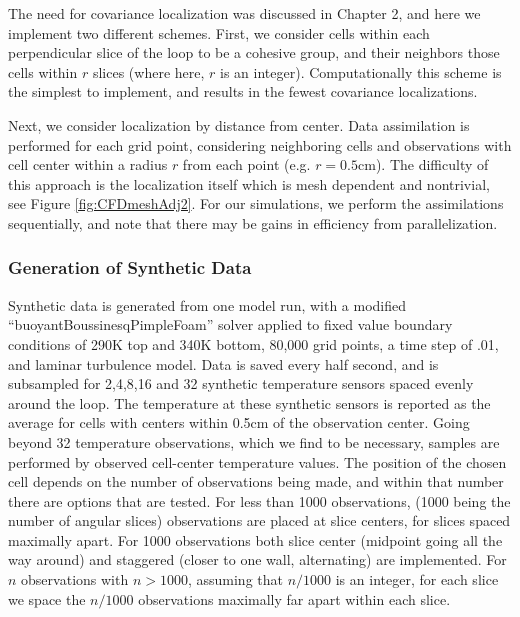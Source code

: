 The need for covariance localization was discussed in Chapter 2, and here we implement two different schemes.
First, we consider cells within each perpendicular slice of the loop to be a cohesive group, and their neighbors those cells within $r$ slices (where here, $r$ is an integer).
Computationally this scheme is the simplest to implement, and results in the fewest covariance localizations.

Next, we consider localization by distance from center.
Data assimilation is performed for each grid point, considering neighboring cells and observations with cell center within a radius $r$ from each point (e.g. $r = 0.5$cm).
The difficulty of this approach is the localization itself which is mesh dependent and nontrivial, see Figure \ref{fig:CFDmeshAdj2}.
For our simulations, we perform the assimilations sequentially, and note that there may be gains in efficiency from parallelization.

\subsubsection{Generation of Synthetic Data}

Synthetic data is generated from one model run, with a modified ``buoyantBoussinesqPimpleFoam'' solver applied to fixed value boundary conditions of 290K top and 340K bottom, 80,000 grid points, a time step of .01, and laminar turbulence model.
Data is saved every half second, and is subsampled for 2,4,8,16 and 32 synthetic temperature sensors spaced evenly around the loop.
The temperature at these synthetic sensors is reported as the average for cells with centers within 0.5cm of the observation center.
Going beyond 32 temperature observations, which we find to be necessary, samples are performed by observed cell-center temperature values.
The position of the chosen cell depends on the number of observations being made, and within that number there are options that are tested.
For less than 1000 observations, (1000 being the number of angular slices) observations are placed at slice centers, for slices spaced maximally apart.
For 1000 observations both slice center (midpoint going all the way around) and staggered (closer to one wall, alternating) are implemented.
For $n$ observations with $n>1000$, assuming that $n/1000$ is an integer, for each slice we space the $n/1000$ observations maximally far apart within each slice.


